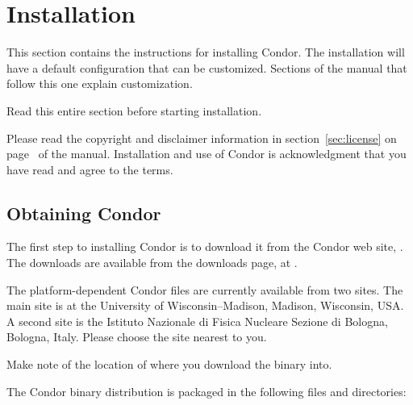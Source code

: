 \section{\label{sec:install}Installation}

This section contains the instructions for installing Condor.
The installation will have a default configuration that can
be customized.
Sections of the manual that follow this one explain customization.

Read this entire section before starting installation.

Please read the copyright and disclaimer information in 
section~\ref{sec:license} on
page~\pageref{sec:license} of the manual.
Installation and
use of Condor is acknowledgment that you have read and agree to the
terms.

\subsection{\label{sec:pre-install-procedure}
Obtaining Condor}
The first step to installing Condor is to download it from the Condor
web site, .
The downloads are available from the downloads page,
at .

The platform-dependent Condor files are currently available from two sites.
The main site is at the University of Wisconsin--Madison,
Madison, Wisconsin, USA.
A second site is the Istituto Nazionale di Fisica Nucleare Sezione di
Bologna, Bologna, Italy.
Please choose the site nearest to you.

Make note of the location of where you download the binary into.

The Condor binary distribution is packaged in the following files
and directories:

